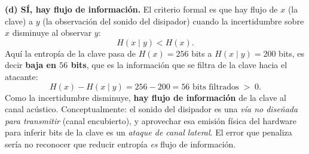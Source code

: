 \medskip
\textbf{(d) SÍ, hay flujo de información.} El criterio formal es que hay flujo de $x$ (la clave) a
$y$ (la observación del sonido del disipador) cuando la incertidumbre sobre $x$ disminuye al
observar $y$:
\begin{equation*}
  H(x \mid y) < H(x).
\end{equation*}
Aquí la entropía de la clave pasa de $H(x) = 256$ bits a $H(x\mid y) = 200$ bits, es decir
\textbf{baja en $56$ bits}, que es la información que se filtra de la clave hacia el atacante:
\begin{equation*}
  H(x) - H(x\mid y) = 256 - 200 = 56 \text{ bits filtrados} \;>\; 0.
\end{equation*}
Como la incertidumbre disminuye, \textbf{hay flujo de información} de la clave al canal acústico.
Conceptualmente: el sonido del disipador es una \emph{vía no diseñada para transmitir} (canal
encubierto), y aprovechar esa emisión física del hardware para inferir bits de la clave es un
\emph{ataque de canal lateral}. El error que penaliza sería no reconocer que reducir entropía
\emph{es} flujo de información.
